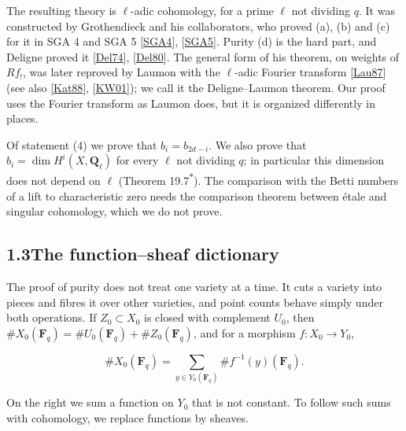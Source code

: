 \documentclass[11pt]{article}
\newcommand{\bpout}[1]{#1\textsuperscript{\hyperlink{bp-outside}{\ensuremath{\ast}}}}
\begin{document}
The resulting theory is \(\ell\)-adic cohomology, for a prime \(\ell\) not dividing \(q\). It was constructed by Grothendieck and his collaborators, who proved (a), (b) and (c) for it in SGA 4 and SGA 5 [\hyperref[bp26]{SGA4}], [\hyperref[bp27]{SGA5}]. Purity (d) is the hard part, and Deligne proved it [\hyperref[bp28]{Del74}], [\hyperref[bp29]{Del80}]. The general form of his theorem, on weights of \(Rf_!\), was later reproved by Laumon with the \(\ell\)-adic Fourier transform [\hyperref[bp30]{Lau87}] (see also [\hyperref[bp31]{Kat88}], [\hyperref[bp32]{KW01}]); we call it the Deligne–Laumon theorem. Our proof uses the Fourier transform as Laumon does, but it is organized differently in places.

Of statement (4) we prove that \(b_i=b_{2d-i}\). We also prove that \(b_i=\dim H^i(X,\mathbf Q_\ell)\) for every \(\ell\) not dividing \(q\); in particular this dimension does not depend on \(\ell\) (Theorem \bpout{19.7}). The comparison with the Betti numbers of a lift to characteristic zero needs the comparison theorem between étale and singular cohomology, which we do not prove.


\subsection*{\texorpdfstring{1.3\quad The function–sheaf dictionary}{1.3 The function–sheaf dictionary}}
\label{bp7}%
\label{bp8}%
The proof of purity does not treat one variety at a time. It cuts a variety into pieces and fibres it over other varieties, and point counts behave simply under both operations. If \(Z_0\subset X_0\) is closed with complement \(U_0\), then \(\#X_0(\mathbf F_q)=\#U_0(\mathbf F_q)+\#Z_0(\mathbf F_q)\), and for a morphism \(f:X_0\to Y_0\),

\[
\#X_0(\mathbf F_q)=\sum_{y\in Y_0(\mathbf F_q)}\#f^{-1}(y)(\mathbf F_q).
\]

On the right we sum a function on \(Y_0\) that is not constant. To follow such sums with cohomology, we replace functions by sheaves.
\end{document}
